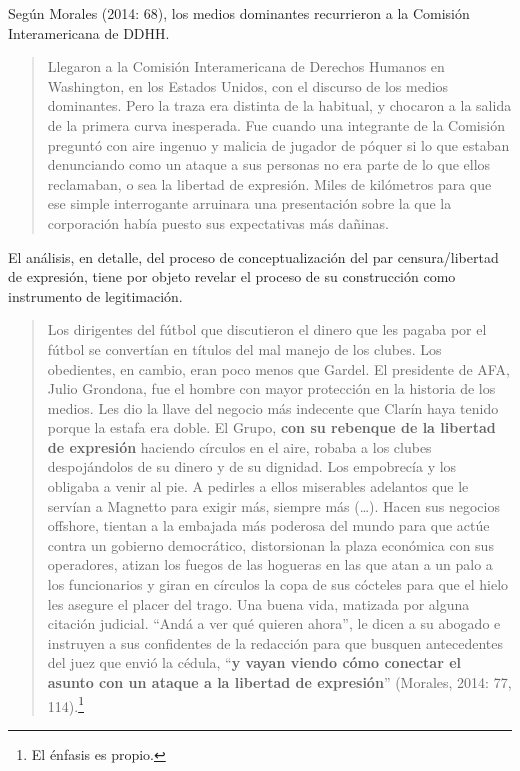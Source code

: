 {Según Morales (2014: 68), los medios dominantes recurrieron a la Comisión Interamericana de DDHH.

\begin{quote}
Llegaron a la Comisión Interamericana de Derechos Humanos en Washington, en los Estados Unidos, con el discurso de los medios dominantes. Pero la traza era distinta de la habitual, y chocaron a la salida de la primera curva inesperada. Fue cuando una integrante de la Comisión preguntó con aire ingenuo y malicia de jugador de póquer si lo que estaban denunciando como un ataque a sus personas no era parte de lo que ellos reclamaban, o sea la libertad de expresión. Miles de kilómetros para que ese simple interrogante arruinara una presentación sobre la que la corporación había puesto sus expectativas más dañinas.
\end{quote}

El análisis, en detalle, del proceso de conceptualización del par censura/libertad de expresión, tiene por objeto revelar el proceso de su construcción como instrumento de legitimación.

\begin{quote}
Los dirigentes del fútbol que discutieron el dinero que les pagaba por el fútbol se convertían en títulos del mal manejo de los clubes. Los obedientes, en cambio, eran poco menos que Gardel. El presidente de AFA, Julio Grondona, fue el hombre con mayor protección en la historia de los medios. Les dio la llave del negocio más indecente que Clarín haya tenido porque la estafa era doble. El Grupo, \textbf{con su rebenque de la libertad de expresión} haciendo círculos en el aire, robaba a los clubes despojándolos de su dinero y de su dignidad. Los empobrecía y los obligaba a venir al pie. A pedirles a ellos miserables adelantos que le servían a Magnetto para exigir más, siempre más (\ldots). Hacen sus negocios offshore, tientan a la embajada más poderosa del mundo para que actúe contra un gobierno democrático, distorsionan la plaza económica con sus operadores, atizan los fuegos de las hogueras en las que atan a un palo a los funcionarios y giran en círculos la copa de sus cócteles para que el hielo les asegure el placer del trago. Una buena vida, matizada por alguna citación judicial. ``Andá a ver qué quieren ahora'', le dicen a su abogado e instruyen a sus confidentes de la redacción para que busquen antecedentes del juez que envió la cédula, ``\textbf{y vayan viendo cómo conectar el asunto con un ataque a la libertad de expresión}'' (Morales, 2014: 77, 114).\footnote{El énfasis es propio.}
\end{quote}

}
